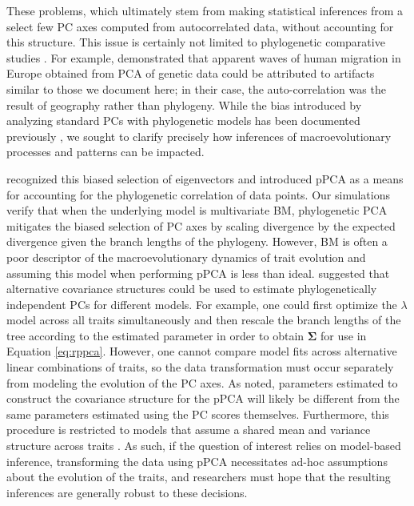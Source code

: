 \documentclass[a4paper,11pt]{article}
\begin{document}
These problems, which ultimately stem from making statistical inferences from a select few PC axes computed from autocorrelated data, without accounting for this structure. This issue is certainly not limited to phylogenetic comparative studies \citep[see][]{Richman1986, Podani2002, Novembre, Jolliffe2002, Bookstein2012}. For example, \citet{Novembre} demonstrated that apparent waves of human migration in Europe obtained from PCA of genetic data \citep[e.g.,][]{Cavalli} could be attributed to artifacts similar to those we document here; in their case, the auto-correlation was the result of geography rather than phylogeny. While the bias introduced by analyzing standard PCs with phylogenetic models has been documented previously \citep{Revell2008, Polly2013}, we sought to clarify precisely how inferences of macroevolutionary processes and patterns can be impacted.  

\citet{Revell2008} recognized this biased selection of eigenvectors and introduced pPCA as a means for accounting for the phylogenetic correlation of data points. Our simulations verify that when the underlying model is multivariate BM, phylogenetic PCA mitigates the biased selection of PC axes by scaling divergence by the expected divergence given the branch lengths of the phylogeny. However, BM is often a poor descriptor of the macroevolutionary dynamics of trait evolution \citep[for example, see][]{Harmon2010, Pennell-adequacy} and assuming this model when performing pPCA is less than ideal. \citet{Revell2008} suggested that alternative covariance structures could be used to estimate phylogenetically independent PCs for different models. For example, one could first optimize the $\lambda$ model \citep{Freckleton2002} across all traits simultaneously and then rescale the branch lengths of the tree according to the estimated parameter in order to obtain $\mathbf{\Sigma}$ for use in Equation \ref{eq:rppca}. However, one cannot compare model fits across alternative linear combinations of traits, so the data transformation must occur separately from modeling the evolution of the PC axes. As \citet{Revell2008} noted, parameters estimated to construct the covariance structure for the pPCA will likely be different from the same parameters estimated using the PC scores themselves. Furthermore, this procedure is restricted to models that assume a shared mean and variance structure across traits \citep[see][for examples where this does not apply]{Hansen2008, Hansen2012SysBio, Bartoszek2012}. As such, if the question of interest relies on model-based inference, transforming the data using pPCA necessitates ad-hoc assumptions about the evolution of the traits, and researchers must hope that the resulting inferences are generally robust to these decisions.
\end{document}
